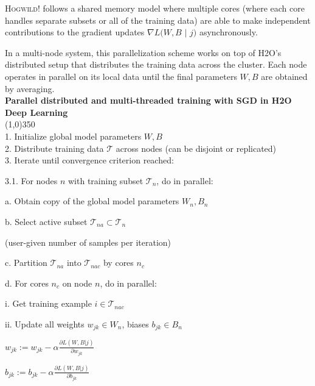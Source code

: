 \textsc{Hogwild!} follows a shared memory model where multiple cores (where each core handles separate subsets or all of the training data) are able to make independent contributions to the gradient updates $\nabla L(W,B$ $ |$ $j)$ asynchronously. 

In a multi-node system, this parallelization scheme works on top of H2O's distributed setup that distributes the training data across the cluster. Each node operates in parallel on its local data until the final parameters $W,B$ are obtained by averaging. 
\\
\newpage
{\bf{\footnotesize{Parallel distributed and multi-threaded training with SGD in H2O Deep Learning}}}
\\
\line(1,0){350}
\\
1. Initialize global model parameters $W,B$
\\
2. Distribute training data $\mathcal{T}$ across nodes (can be disjoint or replicated)
\\
3. Iterate until convergence criterion reached:

\hspace{1cm} 3.1. For nodes $n$ with training subset $\mathcal{T}_n$, do in parallel:

\hspace{2cm}  a. Obtain copy of the global model parameters $W_n, B_n$

\hspace{2cm}  b. Select active subset $\mathcal{T}_{na} \subset \mathcal{T}_n$ 

\hspace{2.5cm} (user-given number of samples per iteration)

\hspace{2cm}  c. Partition $\mathcal{T}_{na}$ into $\mathcal{T}_{nac}$ by cores $n_c$

\hspace{2cm}  d. For cores $n_c$ on node $n$, do in parallel:

\hspace{3cm}  i. Get training example $i \in \mathcal{T}_{nac}$

\hspace{3cm}  ii. Update all weights $w_{jk} \in W_n$, biases $b_{jk} \in B_n$

\hspace{4cm}  $w_{jk} := w_{jk} - \alpha \frac{\partial L(W,B | j)}{\partial w_{jk}}$

\hspace{4cm} $b_{jk} := b_{jk} - \alpha \frac{\partial L(W,B | j)}{\partial b_{jk}}$

